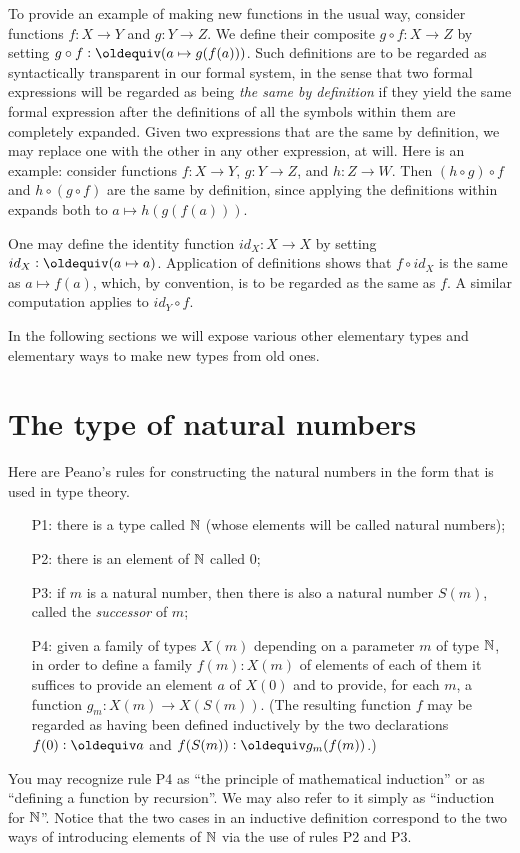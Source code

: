 To provide an example of making new functions in the usual way, consider functions $f : X \to Y$ and $g : Y \to Z$.  We define their composite
$g \circ f : X \to Z$ by setting $g \circ f \defeq (a \mapsto g(f(a)))$.  Such definitions are to be regarded as syntactically transparent in
our formal system, in the sense that two formal expressions will be regarded as being \emph{the same by definition} if they yield the same formal
expression after the definitions of all the symbols within them are completely expanded.  Given two expressions that are the same by definition,
we may replace one with the other in any other expression, at will.  Here is an example: consider functions $f : X \to Y$, $g : Y \to Z$, and $h
: Z \to W$.  Then $(h \circ g) \circ f$ and $h \circ (g \circ f)$ are the same by definition, since applying the definitions within expands both
to $a \mapsto h(g(f(a)))$.

One may define the identity function $id_X : X \to X$ by setting $id_X \defeq (a \mapsto a)$.  Application of definitions shows that $f \circ
id_X$ is the same as $a \mapsto f(a)$, which, by convention, is to be regarded as the same as $f$.  A similar computation applies to $id_Y \circ
f$.

In the following sections we will expose various other elementary types and elementary ways to make new types from old ones.

\section{The type of natural numbers}
\label{sec:natural-numbers}

Here are Peano's rules \citep{peano-principia} for constructing the natural numbers in the form that is used in type theory.
\begin{enumerate}
\item[P1:] there is a type called $\mathbb{N}$ (whose elements will be called natural numbers);
\item[P2:] there is an element of $\mathbb{N}$ called $0$;
\item[P3:] if $m$ is a natural number, then there is also a natural number $S(m)$, called the \emph{successor} of $m$;
\item[P4:] given a family of types $X(m)$ depending on a parameter
  $m$ of type $\mathbb{N}$, in order to define a family $f(m) : X(m)$ of elements of each of them it suffices to provide an element $a$ of $X(0)$ and
  to provide, for each $m$, a function $g_m : X(m) \to X(S(m))$.  (The resulting function $f$ may be regarded as having been defined inductively
  by the two declarations $f(0) \defeq a$ and $f(S(m)) \defeq g_m(f(m))$.)
\end{enumerate}
\nopagebreak
You may recognize rule P4 as ``the principle of mathematical induction'' or as ``defining a function by recursion''.  We may also refer to it
simply as ``induction for $\mathbb{N}$''.  Notice that the two cases in an inductive definition correspond to the two ways of introducing elements of
$\mathbb{N}$ via the use of rules P2 and P3.

